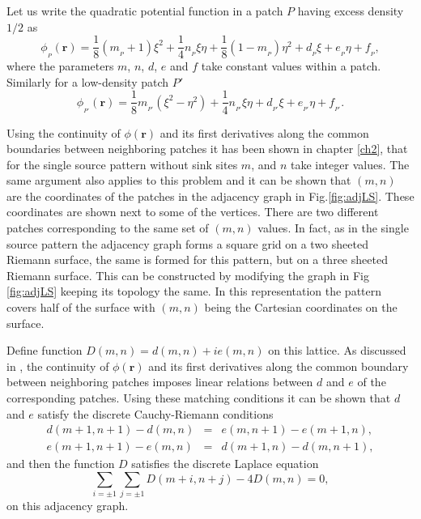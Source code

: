 \documentclass[11pt,a4paper]{book}
\begin{document}
Let us write the quadratic potential function in a patch $P$ having excess density $1/2$ as 
\begin{equation}
\phi_{_P}(\mathbf{r})=\frac{1}{8}(m_{_P}+1)\xi^2+\frac{1}{4}n_{_P}\xi\eta+\frac{1}{8}(1-m_{_P})\eta^2 + d_{_P}\xi+e_{_P}\eta+f_{_P},
\label{fform1}
\end{equation}
where the parameters $m$, $n$, $d$, $e$ and $f$ take 
constant values within a patch. Similarly for a low-density patch $P'$
\begin{equation}
\phi_{_{P'}}(\mathbf{r})=\frac{1}{8}m_{_{P'}}(\xi^{2}-\eta^2)+\frac{1}{4}n_{_{P'}}\xi\eta+d_{_{P'}}\xi+e_{_{P'}}\eta+f_{_{P'}}.
\label{fform2}
\end{equation}

Using the continuity of $\phi\left( \mathbf{r} \right)$ and its first derivatives along the common boundaries
between neighboring patches it has been shown in chapter
\ref{ch2}, that for the single source pattern
without sink sites $m$, and $n$ take integer values. The same argument also applies to this
problem and it can be shown that $\left( m, n \right)$ are the coordinates of the patches in the
adjacency graph in Fig.\ref{fig:adjLS}. These coordinates are shown next to some of the vertices.
There are two different patches corresponding to the same set of $\left( m, n \right)$
values. In fact, as in the single source pattern the adjacency graph
forms a square grid
on a two sheeted Riemann surface, the same is formed for this pattern, but on a
three sheeted Riemann surface. This can be constructed by modifying the graph
in Fig \ref{fig:adjLS} keeping its topology the same. In this representation the pattern covers half of the surface with
$\left( m, n \right)$ being the Cartesian coordinates on the surface.

Define function $D\left( m, n \right)=d\left( m, n \right)+ie\left( m, n \right)$ on this
lattice. As discussed in \cite{myepl}, the continuity of $\phi(\mathbf{r})$ and its first derivatives along the
common boundary between neighboring patches imposes linear relations between $d$ and $e$ of the corresponding
patches. Using these matching conditions it can be
shown that $d$ and $e$ satisfy the discrete Cauchy-Riemann conditions \cite{myepl}
\begin{eqnarray}
d\left( m+1, n+1 \right) - d\left( m, n \right)&=&e\left( m, n+1 \right) - e\left( m+1, n \right), \nonumber \\
e\left( m+1, n+1 \right) - e\left( m, n \right)&=&d\left( m+1, n \right) - d\left( m, n+1 \right),
\label{cr}
\end{eqnarray}
and then the function $D$ satisfies the discrete Laplace equation
\begin{equation}
\sum_{i=\pm1}\sum_{j=\pm1}D(m+i,n+j)-4D(m,n)=0,
\label{laplace}
\end{equation} 
on this adjacency graph.
\end{document}
